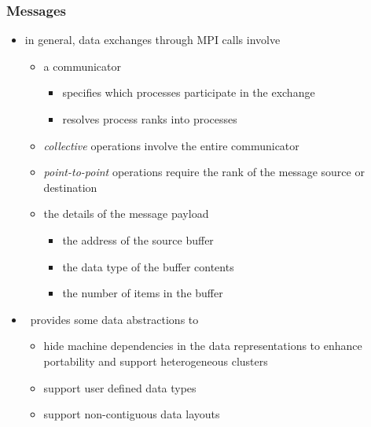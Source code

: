 %
%


\begin{frame}[fragile]
%
  \frametitle{Messages}
%
  \begin{itemize}
%
  \item in general, data exchanges through MPI calls involve
    \begin{itemize}
    \item a communicator
      \begin{itemize}
      \item specifies which processes participate in the exchange
      \item resolves process ranks into processes
      \end{itemize}        
    \item {\em collective} operations involve the entire communicator
    \item {\em point-to-point} operations require the rank of the message source or destination
    \item the details of the message payload
      \begin{itemize}
      \item the address of the source buffer
      \item the data type of the buffer contents
      \item the number of items in the buffer
      \end{itemize}
    \end{itemize}
%
    \item \mpi\ provides some data abstractions to
      \begin{itemize}
      \item hide machine dependencies in the data representations to enhance portability and
        support heterogeneous clusters
      \item support user defined data types
      \item support non-contiguous data layouts
      \end{itemize}        
      
%
  \end{itemize}
%
\end{frame}

